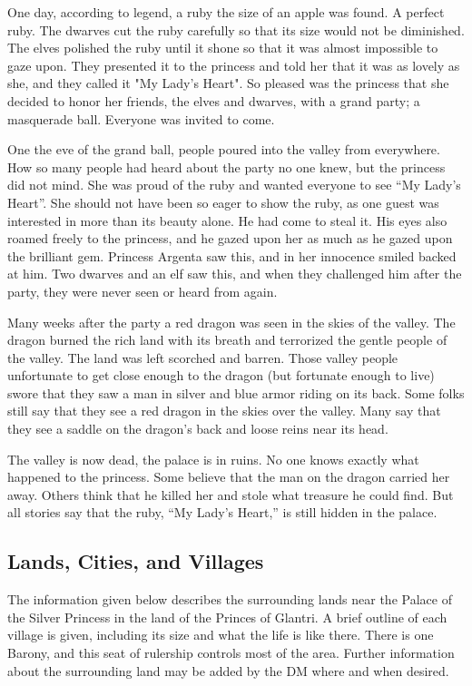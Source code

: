 \documentclass[palace_of_the_silver_princess]{subfiles}
\begin{document}
One day, according to legend, a ruby the size of an apple was found.  A
perfect ruby. The dwarves cut the ruby carefully so that its size would
not be diminished. The elves polished the ruby until it shone so that it
was almost impossible to gaze upon. They presented it to the princess
and told her that it was as lovely as she, and they called it "My Lady’s
Heart". So pleased was the princess that she decided to honor her
friends, the elves and dwarves, with a grand party; a masquerade ball.
Everyone was invited to come.

One the eve of the grand ball, people poured into the valley from
everywhere. How so many people had heard about the party no one knew,
but the princess did not mind. She was proud of the ruby and wanted
everyone to see “My Lady’s Heart”. She should not have been so eager to
show the ruby, as one guest was interested in more than its beauty
alone. He had come to steal it. His eyes also roamed freely to the
princess, and he gazed upon her as much as he gazed upon the brilliant
gem. Princess Argenta saw this, and in her innocence smiled backed at
him. Two dwarves and an elf saw this, and when they challenged him after
the party, they were never seen or heard from again.

Many weeks after the party a red dragon was seen in the skies of the
valley. The dragon burned the rich land with its breath and terrorized
the gentle people of the valley. The land was left scorched and barren.
Those valley people unfortunate to get close enough to the dragon (but
fortunate enough to live) swore that they saw a man in silver and blue
armor riding on its back.  Some folks still say that they see a red
dragon in the skies over the valley. Many say that they see a saddle on
the dragon’s back and loose reins near its head.

The valley is now dead, the palace is in ruins. No one knows exactly
what happened to the princess. Some believe that the man on the dragon
carried her away. Others think that he killed her and stole what
treasure he could find. But all stories say that the ruby, “My Lady’s
Heart,” is still hidden in the palace.

\subsection{Lands, Cities, and Villages}

The information given below describes the surrounding lands near the
Palace of the Silver Princess in the land of the Princes of Glantri. A
brief outline of each village is given, including its size and what the
life is like there. There is one Barony, and this seat of rulership
controls most of the area. Further information about the surrounding
land may be added by the DM where and when desired.
\end{document}
